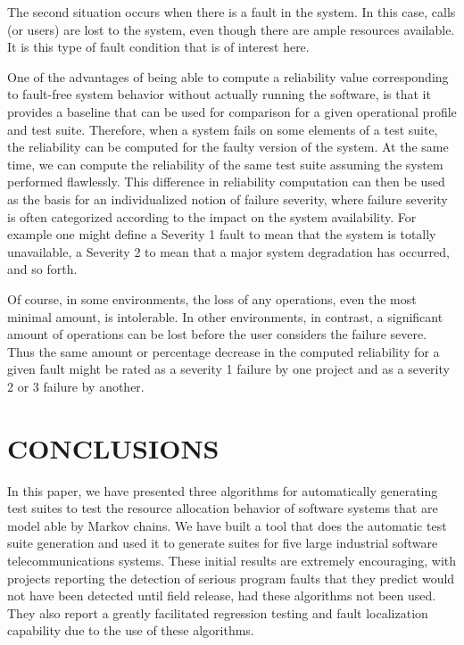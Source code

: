 \documentclass[journal, twoside]{IEEEtran}
\begin{document}
The second situation occurs when there is a fault in the system. In this case, calls (or users) are lost to the system, even
though there are ample resources available. It is this type of
fault condition that is of interest here. 

One of the advantages of being able to compute a reliability
value corresponding to fault-free system behavior without actually running the software, is that it provides a baseline that
can be used for comparison for a given operational profile and
test suite. Therefore, when a system fails on some elements of
a test suite, the reliability can be computed for the faulty version of the system. At the same time, we can compute the reliability of the same test suite assuming the system performed
flawlessly. This difference in reliability computation can then
be used as the basis for an individualized notion of failure severity, where failure severity is often categorized according to
the impact on the system availability. For example one might
define a Severity 1 fault to mean that the system is totally unavailable, a Severity 2 to mean that a major system degradation has occurred, and so forth. 

Of course, in some environments, the loss of any operations,
even the most minimal amount, is intolerable. In other environments, in contrast, a significant amount of operations can
be lost before the user considers the failure severe. Thus the
same amount or percentage decrease in the computed reliability for a given fault might be rated as a severity 1 failure by
one project and as a severity 2 or 3 failure by another. 

\section{CONCLUSIONS}
In this paper, we have presented three algorithms for automatically generating test suites to test the resource allocation
behavior of software systems that are model able by Markov
chains. We have built a tool that does the automatic test suite
generation and used it to generate suites for five large industrial software telecommunications systems. These initial results
are extremely encouraging, with projects reporting the detection of serious program faults that they predict would not have
been detected until field release, had these algorithms not been
used. They also report a greatly facilitated regression testing
and fault localization capability due to the use of these
algorithms. 
\end{document}
